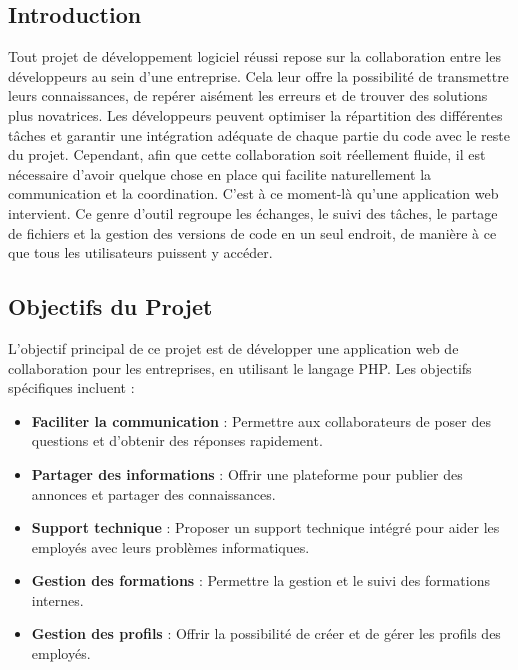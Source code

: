 \documentclass{article}
\begin{document}
        \subsection{Introduction}
            Tout projet de développement logiciel réussi repose sur la collaboration entre les développeurs au sein d'une entreprise. Cela leur offre la possibilité de transmettre leurs connaissances, de repérer aisément les erreurs et de trouver des solutions plus novatrices. Les développeurs peuvent optimiser la répartition des différentes tâches et garantir une intégration adéquate de chaque partie du code avec le reste du projet. Cependant, afin que cette collaboration soit réellement fluide, il est nécessaire d'avoir quelque chose en place qui facilite naturellement la communication et la coordination. C'est à ce moment-là qu'une application web intervient. Ce genre d'outil regroupe les échanges, le suivi des tâches, le partage de fichiers et la gestion des versions de code en un seul endroit, de manière à ce que tous les utilisateurs puissent y accéder.
        \subsection{Objectifs du Projet}
            L'objectif principal de ce projet est de développer une application web de collaboration pour les entreprises, en utilisant le langage PHP. Les objectifs spécifiques incluent :

            \begin{itemize}
                \item \textbf{Faciliter la communication} : Permettre aux collaborateurs de poser des questions et d'obtenir des réponses rapidement.
                \item \textbf{Partager des informations} : Offrir une plateforme pour publier des annonces et partager des connaissances.
                \item \textbf{Support technique} : Proposer un support technique intégré pour aider les employés avec leurs problèmes informatiques.
                \item \textbf{Gestion des formations} : Permettre la gestion et le suivi des formations internes.
                \item \textbf{Gestion des profils} : Offrir la possibilité de créer et de gérer les profils des employés.
            \end{itemize}
\end{document}
